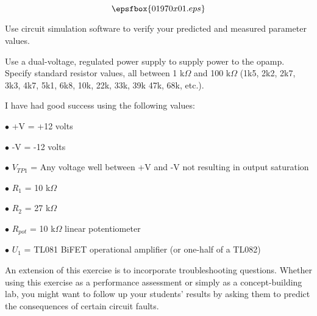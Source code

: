 

$$\epsfbox{01970x01.eps}$$

\vfil \eject






Use circuit simulation software to verify your predicted and measured parameter values.







Use a dual-voltage, regulated power supply to supply power to the opamp.  Specify standard resistor values, all between 1 k$\Omega$ and 100 k$\Omega$ (1k5, 2k2, 2k7, 3k3, 4k7, 5k1, 6k8, 10k, 22k, 33k, 39k 47k, 68k, etc.).

I have had good success using the following values:

\medskip
\item{$\bullet$} +V = +12 volts
\item{$\bullet$} -V = -12 volts
\item{$\bullet$} $V_{TP1}$ = Any voltage well between +V and -V not resulting in output saturation
\item{$\bullet$} $R_1$ = 10 k$\Omega$
\item{$\bullet$} $R_2$ = 27 k$\Omega$
\item{$\bullet$} $R_{pot}$ = 10 k$\Omega$ linear potentiometer
\item{$\bullet$} $U_1$ = TL081 BiFET operational amplifier (or one-half of a TL082)
\medskip

An extension of this exercise is to incorporate troubleshooting questions.  Whether using this exercise as a performance assessment or simply as a concept-building lab, you might want to follow up your students' results by asking them to predict the consequences of certain circuit faults.




